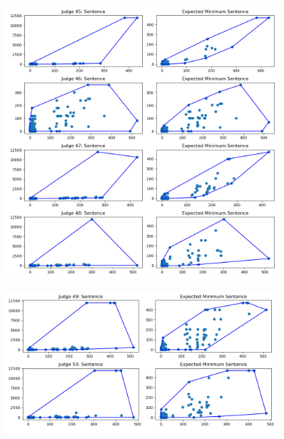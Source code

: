 \documentclass[11pt, oneside]{article}   	%
\theoremstyle{ModifiedStyle}
\begin{document}
			\begin{figure}[H]
				\centering
				\includegraphics[width=0.9\textwidth]{../../output/figures/Exploration/judge_convex_hulls_11.png}
			\end{figure}

			\begin{figure}[H]
				\centering
				\includegraphics[width=0.9\textwidth]{../../output/figures/Exploration/judge_convex_hulls_12.png}
			\end{figure}
\end{document}
